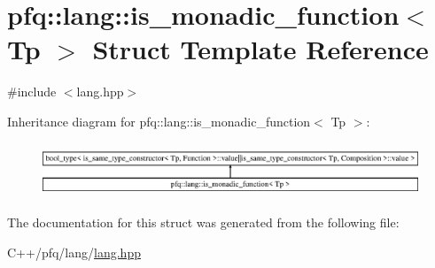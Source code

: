 \hypertarget{structpfq_1_1lang_1_1is__monadic__function}{}\section{pfq\+:\+:lang\+:\+:is\+\_\+monadic\+\_\+function$<$ Tp $>$ Struct Template Reference}
\label{structpfq_1_1lang_1_1is__monadic__function}


{\ttfamily \#include $<$lang.\+hpp$>$}

Inheritance diagram for pfq\+:\+:lang\+:\+:is\+\_\+monadic\+\_\+function$<$ Tp $>$\+:\begin{figure}[H]
\begin{center}
\leavevmode
\includegraphics[height=1.637427cm]{structpfq_1_1lang_1_1is__monadic__function}
\end{center}
\end{figure}


The documentation for this struct was generated from the following file\+:\begin{DoxyCompactItemize}
\item 
C++/pfq/lang/\hyperlink{lang_8hpp}{lang.\+hpp}\end{DoxyCompactItemize}

